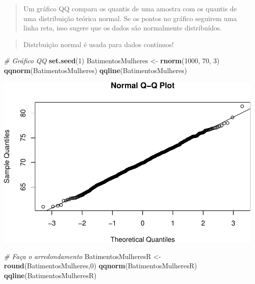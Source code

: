 \documentclass[
]{book}
\newenvironment{Shaded}{\begin{snugshade}}{\end{snugshade}}
\newcommand{\CommentTok}[1]{\textcolor[rgb]{0.56,0.35,0.01}{\textit{#1}}}
\newcommand{\DecValTok}[1]{\textcolor[rgb]{0.00,0.00,0.81}{#1}}
\newcommand{\FunctionTok}[1]{\textcolor[rgb]{0.13,0.29,0.53}{\textbf{#1}}}
\newcommand{\NormalTok}[1]{#1}
\newcommand{\OtherTok}[1]{\textcolor[rgb]{0.56,0.35,0.01}{#1}}
\begin{document}
\begin{quote}
Um gráfico QQ compara os quantis de uma amostra com os quantis de uma distribuição teórica normal. Se os pontos no gráfico seguirem uma linha reta, isso sugere que os dados são normalmente distribuídos.
\end{quote}

\begin{quote}
Distrbuição normal é usada para dados contínuos!
\end{quote}

\begin{Shaded}
\begin{Highlighting}[]
\CommentTok{\# Gráfico QQ}
\FunctionTok{set.seed}\NormalTok{(}\DecValTok{1}\NormalTok{)}
\NormalTok{BatimentosMulheres }\OtherTok{\textless{}{-}} \FunctionTok{rnorm}\NormalTok{(}\DecValTok{1000}\NormalTok{, }\DecValTok{70}\NormalTok{, }\DecValTok{3}\NormalTok{)}
\FunctionTok{qqnorm}\NormalTok{(BatimentosMulheres)}
\FunctionTok{qqline}\NormalTok{(BatimentosMulheres)}
\end{Highlighting}
\end{Shaded}

\includegraphics{Livro-Estatistica+R_files/figure-latex/unnamed-chunk-33-1.pdf}

\begin{Shaded}
\begin{Highlighting}[]
\CommentTok{\# Faça o arredondamento}
\NormalTok{BatimentosMulheresR }\OtherTok{\textless{}{-}} \FunctionTok{round}\NormalTok{(BatimentosMulheres,}\DecValTok{0}\NormalTok{)}
\FunctionTok{qqnorm}\NormalTok{(BatimentosMulheresR)}
\FunctionTok{qqline}\NormalTok{(BatimentosMulheresR)}
\end{Highlighting}
\end{Shaded}
\end{document}
